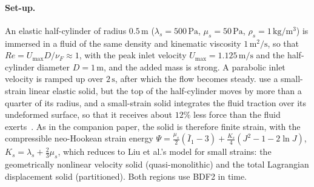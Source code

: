 \paragraph{Set-up.}
An elastic half-cylinder of radius $0.5\,\mathrm{m}$ ($\lambda_s = 500\,\mathrm{Pa}$, $\mu_s = 50\,\mathrm{Pa}$, $\rho_s = 1\,\mathrm{kg/m^3}$) is immersed in a fluid of the same density and kinematic viscosity $1\,\mathrm{m^2/s}$, so that $Re = U_\mathrm{max} D/\nu_F \approx 1$, with the peak inlet velocity $U_\mathrm{max} = 1.125\,\mathrm{m/s}$ and the half-cylinder diameter $D = 1\,\mathrm{m}$, and the added mass is strong.
A parabolic inlet velocity is ramped up over $2\,\mathrm{s}$, after which the flow becomes steady.
\citet{Liu2014} use a small-strain linear elastic solid, but the top of the half-cylinder moves by more than a quarter of its radius, and a small-strain solid integrates the fluid traction over its undeformed surface, so that it receives about $12\%$ less force than the fluid exerts~\citep{CardiffFSIVerification2026}.
As in the companion paper, the solid is therefore finite strain, with the compressible neo-Hookean strain energy $\Psi = \tfrac{\mu_s}{2}(\bar{I}_1 - 3) + \tfrac{K_s}{4}(J^2 - 1 - 2\ln J)$, $K_s = \lambda_s + \tfrac{2}{3}\mu_s$, which reduces to Liu et al.'s model for small strains: the geometrically nonlinear velocity solid (quasi-monolithic) and the total Lagrangian displacement solid (partitioned).
Both regions use BDF2 in time.

